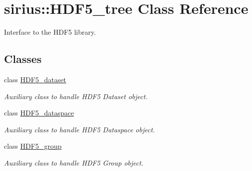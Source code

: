 \hypertarget{classsirius_1_1_h_d_f5__tree}{}\section{sirius\+:\+:H\+D\+F5\+\_\+tree Class Reference}
\label{classsirius_1_1_h_d_f5__tree}


Interface to the H\+D\+F5 library.  


\subsection*{Classes}
\begin{DoxyCompactItemize}
\item 
class \hyperlink{classsirius_1_1_h_d_f5__tree_1_1_h_d_f5__dataset}{H\+D\+F5\+\_\+dataset}
\begin{DoxyCompactList}\small\item\em Auxiliary class to handle H\+D\+F5 Dataset object. \end{DoxyCompactList}\item 
class \hyperlink{classsirius_1_1_h_d_f5__tree_1_1_h_d_f5__dataspace}{H\+D\+F5\+\_\+dataspace}
\begin{DoxyCompactList}\small\item\em Auxiliary class to handle H\+D\+F5 Dataspace object. \end{DoxyCompactList}\item 
class \hyperlink{classsirius_1_1_h_d_f5__tree_1_1_h_d_f5__group}{H\+D\+F5\+\_\+group}
\begin{DoxyCompactList}\small\item\em Auxiliary class to handle H\+D\+F5 Group object. \end{DoxyCompactList}\end{DoxyCompactItemize}
